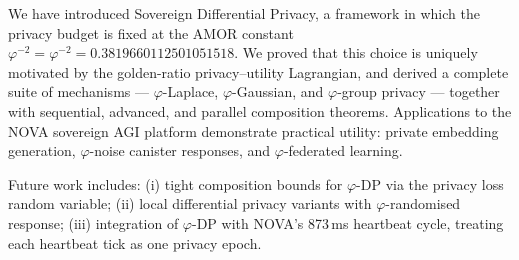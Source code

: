 \documentclass[12pt]{article}
\newcommand{\AMOR}{\varphi^{-2}}
\newcommand{\PHI}{\varphi}
\newcommand{\phiDP}{\varphi\text{-DP}}
\begin{document}
We have introduced Sovereign Differential Privacy, a framework in which the
privacy budget is fixed at the AMOR constant $\AMOR = \PHI^{-2} =
0.3819660112501051518$.  We proved that this choice is uniquely motivated by the
golden-ratio privacy–utility Lagrangian, and derived a complete suite of
mechanisms — $\varphi$-Laplace, $\varphi$-Gaussian, and $\varphi$-group privacy
— together with sequential, advanced, and parallel composition theorems.
Applications to the NOVA sovereign AGI platform demonstrate practical utility:
private embedding generation, $\varphi$-noise canister responses, and
$\varphi$-federated learning.

Future work includes: (i) tight composition bounds for $\varphi$-DP via the
privacy loss random variable; (ii) local differential privacy variants with
$\varphi$-randomised response; (iii) integration of $\phiDP$ with NOVA's
873\,ms heartbeat cycle, treating each heartbeat tick as one privacy epoch.
\end{document}
